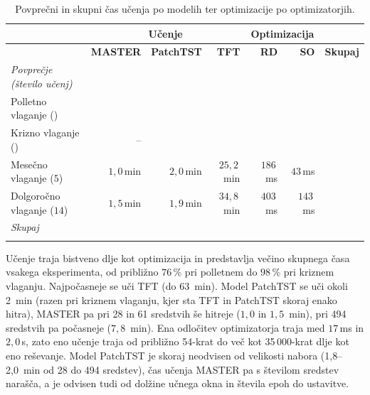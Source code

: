 \documentclass[9pt]{style/friteza}
\begin{document}
\begin{table}[htbp]
\centering
\footnotesize
\setlength{\tabcolsep}{4pt}
\caption{Povprečni in skupni čas učenja po modelih ter optimizacije po optimizatorjih.}
\label{tab:time}
\sffamily\fontsize{7.5}{10}\selectfont %
\begin{tabular*}{\linewidth}{@{\extracolsep{\fill}}lrrrrrr}
\hline
 \rule[-3pt]{0pt}{12.5pt} & \multicolumn{3}{c}{\textbf{Učenje}} & \multicolumn{2}{c}{\textbf{Optimizacija}} & \\
\hline
 \rule[-3pt]{0pt}{12.5pt} & \textbf{MASTER} & \textbf{PatchTST} & \textbf{TFT} & \textbf{RD} & \textbf{SO} & \textbf{Skupaj} \\
\hline
 \rule[-3pt]{0pt}{12.5pt}\textit{Povprečje (število učenj)} & & & & & & \\
Polletno vlaganje (\WangTrainNMASTER{}) & \WangTrainPerMASTER{} & \WangTrainPerPatchTST{} & \WangTrainPerTFT{} & \WangSolvePSO{} & \WangSolveSA{} & \\
Krizno vlaganje (\LeowAWTrainNTFT{}) & -- & \LeowAWTrainPerPatchTST{} & \LeowAWTrainPerTFT{} & \LeowAWSolvePSO{} & \LeowAWSolveSA{} & \\
Mesečno vlaganje ($5$) & $1{,}0$\,min & $2{,}0$\,min & $25{,}2$\,min & $186$\,ms & $43$\,ms & \\
Dolgoročno vlaganje ($14$) & $1{,}5$\,min & $1{,}9$\,min & $34{,}8$\,min & $403$\,ms & $143$\,ms & \\
\hline
 \rule[-3pt]{0pt}{12.5pt}\textit{Skupaj} & & & & & & \\
\\
\hline
\end{tabular*}
\end{table}

Učenje traja bistveno dlje kot optimizacija in predstavlja večino skupnega časa vsakega eksperimenta, od približno $76\,\%$ pri polletnem do $98\,\%$ pri kriznem vlaganju. Najpočasneje se uči TFT (do 63~min). Model PatchTST se uči okoli 2~min (razen pri kriznem vlaganju, kjer sta TFT in PatchTST skoraj enako hitra), MASTER pa pri 28 in 61 sredstvih še hitreje ($1{,}0$ in $1{,}5$~min), pri 494 sredstvih pa počasneje ($7{,}8$~min). Ena odločitev optimizatorja traja med $17\,$ms in $2{,}0\,$s, zato eno učenje traja od približno 54-krat do več kot 35\,000-krat dlje kot eno reševanje. Model PatchTST je skoraj neodvisen od velikosti nabora (1,8--2,0~min od 28 do 494 sredstev), čas učenja MASTER pa s številom sredstev narašča, a je odvisen tudi od dolžine učnega okna in števila epoh do ustavitve.
\end{document}
